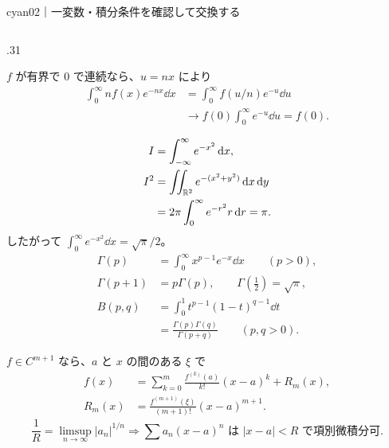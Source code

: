 \begin{sheetframe}[50]{cyan}{02｜一変数・積分}{条件を確認して交換する}
\begin{columns}[T,onlytextwidth]
\begin{column}{.31\textwidth}
\separator
{}
\begin{center}
\end{center}
$f$ が有界で $0$ で連続なら、$u=nx$ により
\[
\begin{aligned}
\int_0^\infty nf(x)e^{-nx}\dd x
&=\int_0^\infty f(u/n)e^{-u}\dd u\\
&\longrightarrow f(0)\int_0^\infty e^{-u}\dd u=f(0).
\end{aligned}
\]

\separator
{}
\[
\begin{aligned}
I&=\int_{-\infty}^{\infty}e^{-x^2}\,\mathrm d x,\\
I^2&=\iint_{\mathbb{R}^2}e^{-(x^2+y^2)}\,\mathrm d x\,\mathrm d y\\
&=2\pi\int_0^\infty e^{-r^2}r\,\mathrm d r=\pi.
\end{aligned}
\]
したがって $\int_0^\infty e^{-x^2}\dd x=\sqrt\pi/2$。
\[
\begin{aligned}
\Gamma(p)&=\int_0^\infty x^{p-1}e^{-x}\dd x\qquad(p>0),\\
\Gamma(p+1)&=p\Gamma(p),\qquad\Gamma(\tfrac12)=\sqrt\pi,\\
B(p,q)&=\int_0^1t^{p-1}(1-t)^{q-1}\dd t\\
&=\frac{\Gamma(p)\Gamma(q)}{\Gamma(p+q)}
\qquad(p,q>0).
\end{aligned}
\]

\separator
{}
$f\in C^{m+1}$ なら、$a$ と $x$ の間のある $\xi$ で
\[
\begin{aligned}
f(x)&=\sum_{k=0}^{m}\frac{f^{(k)}(a)}{k!}(x-a)^k+R_m(x),\\
R_m(x)&=\frac{f^{(m+1)}(\xi)}{(m+1)!}(x-a)^{m+1}.
\end{aligned}
\]
\[
\frac1R=\limsup_{n\to\infty}|a_n|^{1/n}
\Rightarrow
\sum a_n(x-a)^n\text{ は }|x-a|<R\text{ で項別微積分可}.
\]
\end{column}
\end{columns}
\end{sheetframe}
